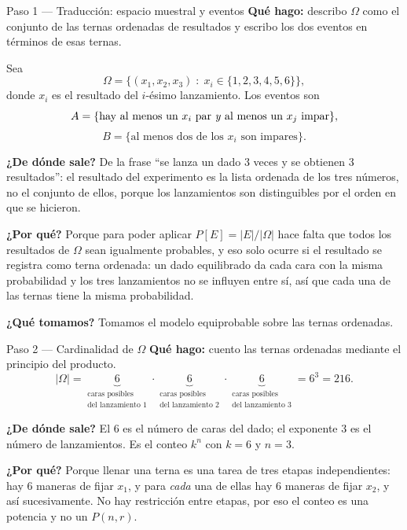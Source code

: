 \documentclass[11pt]{article}
\begin{document}
\begin{sol}

\begin{paso}{Paso 1 --- Traducci\'on: espacio muestral y eventos}
\textbf{Qu\'e hago:} describo $\Omega$ como el conjunto de las ternas ordenadas de resultados y escribo los dos eventos en t\'erminos de esas ternas.

Sea
\[
\Omega=\{(x_1,x_2,x_3)\;:\;x_i\in\{1,2,3,4,5,6\}\},
\]
donde $x_i$ es el resultado del $i$-\'esimo lanzamiento. Los eventos son
\[
A=\{\text{hay al menos un } x_i \text{ par \emph{y} al menos un } x_j \text{ impar}\},
\]
\[
B=\{\text{al menos dos de los } x_i \text{ son impares}\}.
\]

\textbf{¿De d\'onde sale?} De la frase ``se lanza un dado 3 veces y se obtienen 3 resultados'': el resultado del experimento es la lista ordenada de los tres n\'umeros, no el conjunto de ellos, porque los lanzamientos son distinguibles por el orden en que se hicieron.

\textbf{¿Por qu\'e?} Porque para poder aplicar $P[E]=|E|/|\Omega|$ hace falta que todos los resultados de $\Omega$ sean igualmente probables, y eso solo ocurre si el resultado se registra como terna ordenada: un dado equilibrado da cada cara con la misma probabilidad y los tres lanzamientos no se influyen entre s\'i, as\'i que cada una de las ternas tiene la misma probabilidad.

\textbf{¿Qu\'e tomamos?} Tomamos el modelo equiprobable sobre las ternas ordenadas.
\end{paso}

\begin{paso}{Paso 2 --- Cardinalidad de $\Omega$}
\textbf{Qu\'e hago:} cuento las ternas ordenadas mediante el principio del producto.
\[
|\Omega|=\underbrace{6}_{\substack{\text{caras posibles}\\ \text{del lanzamiento 1}}}\cdot
\underbrace{6}_{\substack{\text{caras posibles}\\ \text{del lanzamiento 2}}}\cdot
\underbrace{6}_{\substack{\text{caras posibles}\\ \text{del lanzamiento 3}}}
=6^{3}=216 .
\]

\textbf{¿De d\'onde sale?} El $6$ es el n\'umero de caras del dado; el exponente $3$ es el n\'umero de lanzamientos. Es el conteo $k^{n}$ con $k=6$ y $n=3$.

\textbf{¿Por qu\'e?} Porque llenar una terna es una tarea de tres etapas independientes: hay $6$ maneras de fijar $x_1$, y para \emph{cada} una de ellas hay $6$ maneras de fijar $x_2$, y as\'i sucesivamente. No hay restricci\'on entre etapas, por eso el conteo es una potencia y no un $P(n,r)$.


\end{paso}
\end{sol}
\end{document}
